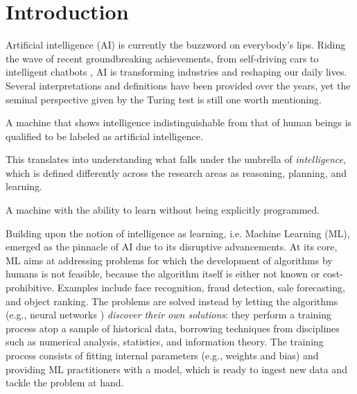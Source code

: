 \documentclass[a4paper,12pt,times,numbered,print,index]{Classes/PhDThesisPSnPDF}
\begin{document}
\frontmatter

% 
\newpage
% 

% 



\tableofcontents

\mainmatter
\sloppy
% 

\chapter*{Introduction}

Artificial intelligence (AI) is currently the buzzword on everybody's lips.
Riding the wave of recent groundbreaking achievements, from self-driving cars \citep{} to intelligent chatbots \citep{}, AI is transforming industries and reshaping our daily lives.
Several interpretations and definitions have been provided over the years, yet the seminal perspective given by the Turing test \citep{turing1980computing} is still one worth mentioning.
\begin{definition}
A machine that shows intelligence indistinguishable from that of human beings is qualified to be labeled as artificial intelligence.
\end{definition}
This translates into understanding what falls under the umbrella of \textit{intelligence}, which is defined differently across the research areas as reasoning, planning, and learning.

\begin{definition}
A machine with the ability to learn without being explicitly programmed.
\end{definition}
Building upon the notion of intelligence as learning, i.e. Machine Learning (ML), emerged as the pinnacle of AI due to its disruptive advancements.
At its core, ML aims at addressing problems for which the development of algorithms by humans is not feasible, because the algorithm itself is either not known or cost-prohibitive.
Examples include face recognition, fraud detection, sale forecasting, and object ranking. 
The problems are solved instead by letting the algorithms (e.g., neural networks \cite{}) \textit{discover their own solutions}: they perform a training process atop a sample of historical data, borrowing techniques from disciplines such as numerical analysis, statistics, and information theory.
The training process consists of fitting internal parameters (e.g., weights and bias) and providing ML practitioners with a model, which is ready to ingest new data and tackle the problem at hand.
\end{document}
